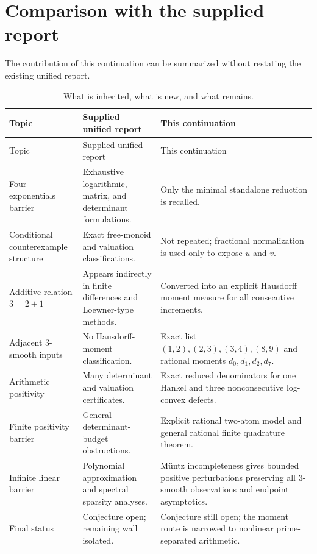 \documentclass[11pt,oneside]{article}
\theoremstyle{definition}
\theoremstyle{remark}
\begin{document}
\section{Comparison with the supplied report}

The contribution of this continuation can be summarized without restating the existing
unified report.

\begin{longtable}{@{}>{\raggedright\arraybackslash}p{}>{\raggedright\arraybackslash}p{}>{\raggedright\arraybackslash}p{}@{}}
\caption{What is inherited, what is new, and what remains.}\label{tab:comparison}\\
\toprule
Topic & Supplied unified report & This continuation\\
\midrule
\endfirsthead
\toprule
Topic & Supplied unified report & This continuation\\
\midrule
\endhead
Four-exponentials barrier
& Exhaustive logarithmic, matrix, and determinant formulations.
& Only the minimal standalone reduction is recalled.\\[0.5em]
Conditional counterexample structure
& Exact free-monoid and valuation classifications.
& Not repeated; fractional normalization is used only to expose $u$ and $v$.\\[0.5em]
Additive relation $3=2+1$
& Appears indirectly in finite differences and Loewner-type methods.
& Converted into an explicit Hausdorff moment measure for all consecutive increments.\\[0.5em]
Adjacent $3$-smooth inputs
& No Hausdorff-moment classification.
& Exact list $(1,2),(2,3),(3,4),(8,9)$ and rational moments $d_0,d_1,d_2,d_7$.\\[0.5em]
Arithmetic positivity
& Many determinant and valuation certificates.
& Exact reduced denominators for one Hankel and three nonconsecutive log-convex defects.\\[0.5em]
Finite positivity barrier
& General determinant-budget obstructions.
& Explicit rational two-atom model and general rational finite quadrature theorem.\\[0.5em]
Infinite linear barrier
& Polynomial approximation and spectral sparsity analyses.
& M\"untz incompleteness gives bounded positive perturbations preserving all $3$-smooth
  observations and endpoint asymptotics.\\[0.5em]
Final status
& Conjecture open; remaining wall isolated.
& Conjecture still open; the moment route is narrowed to nonlinear prime-separated arithmetic.\\
\bottomrule
\end{longtable}
\end{document}
